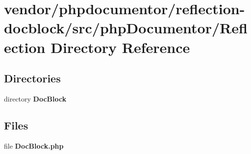 \section{vendor/phpdocumentor/reflection-\/docblock/src/php\+Documentor/\+Reflection Directory Reference}
\label{dir_c943c3811dfec0eab6383ba963b280df}
\subsection*{Directories}
\begin{DoxyCompactItemize}
\item 
directory {\bf Doc\+Block}
\end{DoxyCompactItemize}
\subsection*{Files}
\begin{DoxyCompactItemize}
\item 
file {\bf Doc\+Block.\+php}
\end{DoxyCompactItemize}
